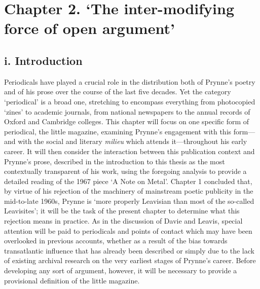 \documentclass[]{article}
\begin{document}
\section{Chapter 2. ‘The inter-modifying force of open
argument’}\label{chapter-2.-the-inter-modifying-force-of-open-argument}

\subsection{i. Introduction}\label{i.-introduction-1}

Periodicals have played a crucial role in the distribution both of
Prynne’s poetry and of his prose over the course of the last five
decades. Yet the category ‘periodical’ is a broad one, stretching to
encompass everything from photocopied ‘zines’ to academic journals, from
national newspapers to the annual records of Oxford and Cambridge
colleges. This chapter will focus on one specific form of periodical,
the little magazine, examining Prynne’s engagement with this form—and
with the social and literary \emph{milieu} which attends it—throughout
his early career. It will then consider the interaction between this
publication context and Prynne’s prose, described in the introduction to
this thesis as the most contextually transparent of his work, using the
foregoing analysis to provide a detailed reading of the 1967 piece ‘A
Note on Metal’. Chapter 1 concluded that, by virtue of his rejection of
the machinery of mainstream poetic publicity in the mid-to-late 1960s,
Prynne is ‘more properly Leavisian than most of the so-called
Leavisites’; it will be the task of the present chapter to determine
what this rejection means in practice. As in the discussion of Davie and
Leavis, special attention will be paid to periodicals and points of
contact which may have been overlooked in previous accounts, whether as
a result of the bias towards transatlantic influence that has already
been described or simply due to the lack of existing archival research
on the very earliest stages of Prynne’s career. Before developing any
sort of argument, however, it will be necessary to provide a provisional
definition of the little magazine.
\end{document}
